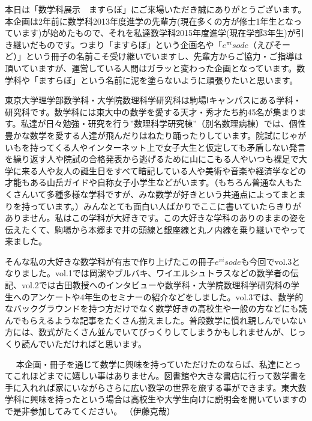 本日は「数学科展示　ますらぼ」にご来場いただき誠にありがとうございます。本企画は2年前に数学科2013年度進学の先輩方(現在多くの方が修士1年生となっています)が始めたもので、それを私達数学科2015年度進学(現在学部3年生)が引き継いだものです。つまり「ますらぼ」という企画名や「$e^{\pi i}sode$（えぴそーど）」という冊子の名前こそ受け継いでいますし、先輩方からご協力・ご指導は頂いていますが、運営している人間はガラッと変わった企画となっています。数学科や「ますらぼ」という名前に泥を塗らないように頑張りたいと思います。\par
東京大学理学部数学科・大学院数理科学研究科は駒場Ⅰキャンパスにある学科・研究科です。数学科には東大中の数学を愛する天才・秀才たち約45名が集まります。私達が日々勉強・研究を行う”数理科学研究棟”（別名数理病棟）では、個性豊かな数学を愛する人達が飛んだりはねたり踊ったりしています。院試にじゃがいもを持ってくる人やインターネット上で女子大生と仮定しても矛盾しない発言を繰り返す人や院試の合格発表から逃げるために山にこもる人やいつも裸足で大学に来る人や友人の誕生日をすべて暗記している人や美術や音楽や経済学などの才能もある山岳ガイドや自称女子小学生などがいます。（もちろん普通な人もたくさんいて多種多様な学科ですが、みな数学が好きという共通点によってまとまりを持っています。）みんなとても面白い人ばかりでここに書いていたらきりがありません。私はこの学科が大好きです。この大好きな学科のありのままの姿を伝えたくて、駒場から本郷まで井の頭線と銀座線と丸ノ内線を乗り継いでやって来ました。\par
そんな私の大好きな数学科が有志で作り上げたこの冊子$e^{\pi i}sode$も今回でvol.3となりました。vol.1では岡潔やブルバキ、ワイエルシュトラスなどの数学者の伝記、vol.2では古田教授へのインタビューや数学科・大学院数理科学研究科の学生へのアンケートや4年生のセミナーの紹介などをしました。vol.3では、数学的なバックグラウンドを持つ方だけでなく数学好きの高校生や一般の方などにも読んでもらえるような記事をたくさん揃えました。普段数学に慣れ親しんでいない方には、数式がたくさん並んでいてびっくりしてしまうかもしれませんが、じっくり読んでいただければと思います。\par　
本企画・冊子を通じて数学に興味を持っていただけたのならば、私達にとってこれほどまでに嬉しい事はありません。図書館や大きな書店に行って数学書を手に入れれば家にいながらさらに広い数学の世界を旅する事ができます。東大数学科に興味を持ったという場合は高校生や大学生向けに説明会を開いていますので是非参加してみてください。
（伊藤克哉）
